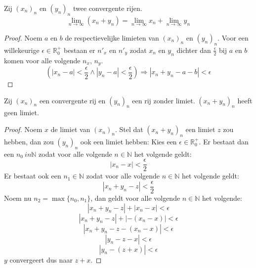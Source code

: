\documentclass[main.tex]{subfiles}
\begin{document}
\begin{bst}
  \label{st:som-van-limieten-is-limiet-van-som}
  Zij $(x_{n})_{n}$ en $(y_{n})_{n}$ twee convergente rijen.
  \[ \lim_{n \rightarrow \infty}(x_{n}+y_{n}) = \lim_{n\rightarrow \infty}x_{n} + \lim_{n\rightarrow \infty}y_{n} \]

  \begin{proof}
    Noem $a$ en $b$ de respectievelijke limieten van $(x_{n})_{n}$ en $(y_{n})_{n}$.
    Voor een willekeurige $\epsilon \in \mathbb{R}_{0}^{+}$ bestaan er $n'_{x}$ en $n'_{y}$ zodat $x_{n}$ en $y_{n}$ dichter dan $\frac{\epsilon}{2}$ bij $a$ en $b$ komen voor alle volgende $n_{x}$, $n_{y}$.
    \[ \left( |x_{n}-a| < \frac{\epsilon}{2} \wedge |y_{n}-a| < \frac{\epsilon}{2} \right) \Rightarrow |x_{n}+y_{n} - a-b| < \epsilon \]
  \end{proof}
\end{bst}

\begin{bst}
  Zij $(x_{n})_{n}$ een convergente rij en $(y_{n})_{n}$ een rij zonder limiet.
  $(x_{n}+y_{n})_{n}$ heeft geen limiet.
  
  \begin{proof}
    Noem $x$ de limiet van $(x_{n})_{n}$.
    Stel dat $(x_{n}+y_{n})_{n}$ een limiet $z$ zou hebben, dan zou $(y_{n})_{n}$ ook een limiet hebben:
    Kies een $\epsilon \in \mathbb{R}_{0}^{+}$.
    Er bestaat dan een $n_{0}\ in \mathbb{N}$ zodat voor alle volgende $n\in \mathbb{N}$ het volgende geldt:
    \[ |x_{n}-x| < \frac{\epsilon}{2} \]
    Er bestaat ook een $n_{1}\in \mathbb{N}$ zodat voor alle volgende $n\in \mathbb{N}$ het volgende geldt:
    \[ |x_{n}+y_{n}-z| < \frac{\epsilon}{2} \]
    Noem nu $n_{2} = \max\{n_{0},n_{1}\}$, dan geldt voor alle volgende $n\in \mathbb{N}$ het volgende:
    \[ |x_{n}+y_{n}-z|+|x_{n}-x| < \epsilon \]
    \[ |x_{n}+y_{n}-z|+|-(x_{n}-x)| < \epsilon \]
    \[ |x_{n}+y_{n}-z-(x_{n}-x)| < \epsilon \]
    \[ |y_{n}-z-x| < \epsilon \]
    \[ |y_{n}-(z+x)| < \epsilon \]
    $y$ convergeert dus naar $z+x$.
\feed
  \end{proof}
\end{bst}
\end{document}

